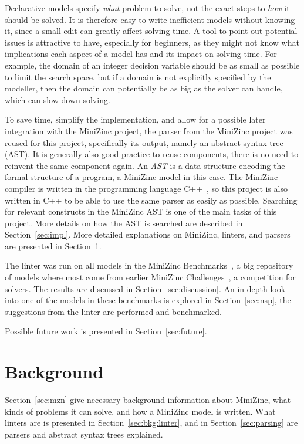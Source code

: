 \documentclass[a4paper,12pt]{article}
\begin{document}
Declarative models specify \emph{what} problem to solve, not the exact steps to \emph{how}
it should be solved. It is therefore easy to write inefficient models without knowing it,
since a small edit can greatly affect solving time. A tool to point out potential issues
is attractive to have, especially for beginners, as they might not know what implications
each aspect of a model has and its impact on solving time. For example, the domain of an
integer decision variable should be as small as possible to limit the search space, but if a
domain is not explicitly specified by the modeller, then the domain can potentially be 
as big as the solver can handle, which can slow down solving.

To save time, simplify the implementation, and allow for a possible later integration with
the MiniZinc project, the parser from the MiniZinc project was reused for this project,
specifically its output, namely an abstract syntax tree (AST).
It is generally also good practice to reuse components, there is no need to reinvent the same component again.
An \emph{AST} is a data
structure encoding the formal structure of a program, a MiniZinc model in this case. The
MiniZinc compiler is written in the programming language C++~\cite{cpp}, so this project
is also written in C++ to be able to use the same parser as easily as possible.
Searching
for relevant constructs in the MiniZinc AST is one of the main tasks of this project. More
details on how the AST is searched are described in Section~\ref{sec:impl}.
More detailed explanations on MiniZinc, linters, and parsers are presented in Section~\ref{sec:bakgrund}.

The linter was run on all models in the MiniZinc Benchmarks~\cite{mznbench}, a
big repository of models where most come from earlier MiniZinc
Challenges~\cite{MZN:Challenge}, a competition for solvers. The results are
discussed in Section~\ref{sec:discussion}. An in-depth look into one of the models in
these benchmarks is explored in Section~\ref{sec:nsp}, the suggestions from the linter are
performed and benchmarked.

Possible future work is presented in Section~\ref{sec:future}.

\section{Background}\label{sec:bakgrund}
Section~\ref{sec:mzn} give necessary background information about MiniZinc, what kinds of
problems it can solve, and how a MiniZinc model is written.
What linters are is presented in Section~\ref{sec:bkg:linter}, and in 
Section~\ref{sec:parsing} are parsers and abstract syntax trees explained.
\end{document}
